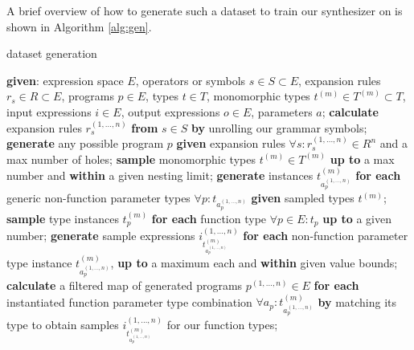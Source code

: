 \documentclass{article} %
\begin{document}
A brief overview of how to generate such a dataset to train our synthesizer on is shown in Algorithm \ref{alg:gen}.

\begin{algorithm}
    \caption{dataset generation}
    \label{alg:gen}
    \begin{algorithmic}
        \State \textbf{given}: expression space $E$, operators or symbols $s \in S \subset E$, expansion rules $r_s \in R \subset E$, programs $p \in E$, types $t \in T$, monomorphic types $t^{(m)} \in T^{(m)} \subset T$, input expressions $i \in E$, output expressions $o \in E$, parameters $a$;
        \State \textbf{calculate} expansion rules $r_s^{(1, \dots, n)}$ \textbf{from} $s \in S$ \textbf{by} unrolling our grammar symbols; %
        \State \textbf{generate} any possible program $p$ \textbf{given} expansion rules $\forall s : r_s^{(1, \dots, n)} \in R^n$ and a max number of holes;
        \State \textbf{sample} monomorphic types $t^{(m)} \in T^{(m)}$ \textbf{up to} a max number and \textbf{within} a given nesting limit;
        \State \textbf{generate} instances $t^{(m)}_{a_p^{(1, \dots, n)}}$ \textbf{for each} generic non-function parameter types $\forall p : t_{a_p^{(1, \dots, n)}}$ \textbf{given} sampled types $t^{(m)}$;
        \State \textbf{sample} type instances $t^{(m)}_p$ \textbf{for each} function type $\forall p \in E: t_p$ \textbf{up to} a given number;
        \State \textbf{generate} sample expressions $i_{t^{(m)}_{a_p^{(1, \dots, n)}}}^{(1, \dots, n)}$ \textbf{for each} non-function parameter type instance $t^{(m)}_{a_p^{(1, \dots, n)}}$, \textbf{up to} a maximum each and \textbf{within} given value bounds;
        \State \textbf{calculate} a filtered map of generated programs $p^{(1, \dots, n)} \in E$ \textbf{for each} instantiated function parameter type combination $\forall a_p : t^{(m)}_{a_p^{(1, \dots, n)}}$ \textbf{by} matching its type to obtain samples $i_{t^{(m)}_{a_p^{(1, \dots, n)}}}^{(1, \dots, n)}$ for our function types;

\end{algorithmic}
\end{algorithm}
\end{document}
